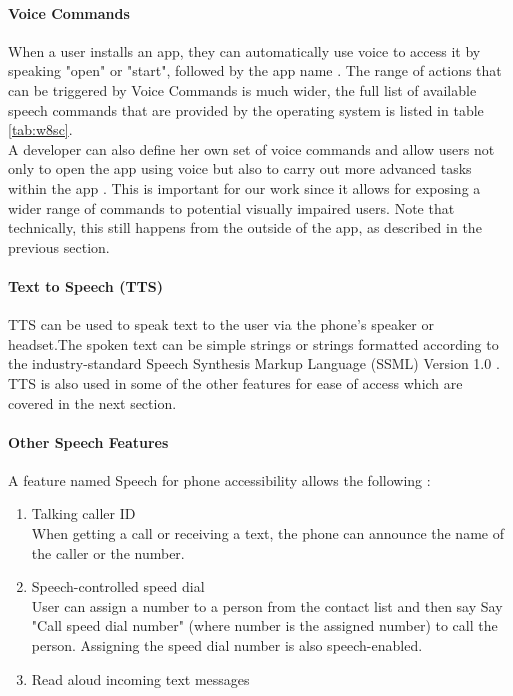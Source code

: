\paragraph{Voice Commands}
When a user installs an app, they can automatically use voice to access it by speaking "open" or "start", followed by the app name \cite{wp8voice}. The range of actions that can be triggered by Voice Commands is much wider, the full list of available speech commands that are provided by the operating system is listed in table \ref{tab:w8sc}.\\
A developer can also define her own set of voice commands and allow users not only to open the app using voice but also to carry out more advanced tasks within the app \cite{wp8voice}. This is important for our work since it allows for exposing a wider range of commands to potential visually impaired users. Note that technically, this still happens from the outside of the app, as described in the previous section.

\paragraph{Text to Speech (TTS)}
TTS can be used to speak text to the user via the phone's speaker or headset.The spoken text can be simple strings or strings formatted according to the industry-standard Speech Synthesis Markup Language (SSML) Version 1.0 \cite{phone8speech}. TTS is also used in some of the other features for ease of access which are covered in the next section.

\paragraph{Other Speech Features}
A feature named Speech for phone accessibility allows the following \cite{wp8voice}:
\begin{enumerate}
\item Talking caller ID\\
When getting a call or receiving a text, the phone can announce the name of the caller or the number.
\item Speech-controlled speed dial\\
User can assign a number to a person from the contact list and then say Say "Call speed dial number" (where number is the assigned number) to call the person. Assigning the speed dial number is also speech-enabled.
\item Read aloud incoming text messages
\end{enumerate}

